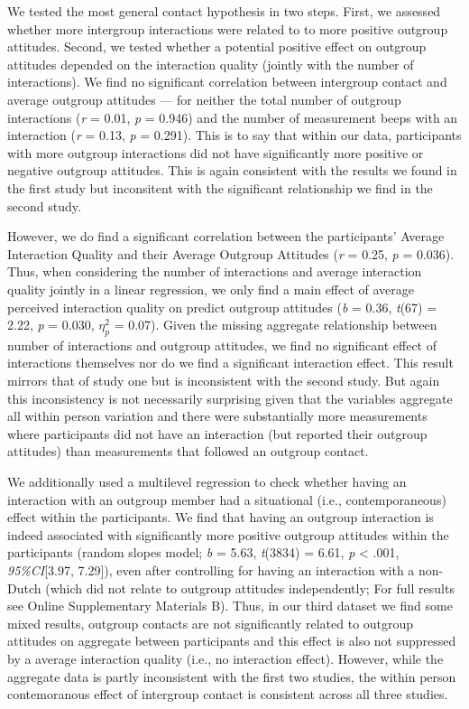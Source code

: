 We tested the most general contact hypothesis in two steps. First, we
assessed whether more intergroup interactions were related to to more
positive outgroup attitudes. Second, we tested whether a potential
positive effect on outgroup attitudes depended on the interaction
quality (jointly with the number of interactions). We find no
significant correlation between intergroup contact and average outgroup
attitudes --- for neither the total number of outgroup interactions
(\textit{r} = 0.01, \textit{p} = 0.946) and the number of measurement
beeps with an interaction (\textit{r} = 0.13, \textit{p} = 0.291). This
is to say that within our data, participants with more outgroup
interactions did not have significantly more positive or negative
outgroup attitudes. This is again consistent with the results we found
in the first study but inconsitent with the significant relationship we
find in the second study.

However, we do find a significant correlation between the participants'
Average Interaction Quality and their Average Outgroup Attitudes
(\textit{r} = 0.25, \textit{p} = 0.036). Thus, when considering the
number of interactions and average interaction quality jointly in a
linear regression, we only find a main effect of average perceived
interaction quality on predict outgroup attitudes (\textit{b} = 0.36,
\textit{t}(67) = 2.22, \textit{p} = 0.030, \(\eta_p^2\) = 0.07). Given
the missing aggregate relationship between number of interactions and
outgroup attitudes, we find no significant effect of interactions
themselves nor do we find a significant interaction effect. This result
mirrors that of study one but is inconsistent with the second study. But
again this inconsistency is not necessarily surprising given that the
variables aggregate all within person variation and there were
substantially more measurements where participants did not have an
interaction (but reported their outgroup attitudes) than measurements
that followed an outgroup contact.

We additionally used a multilevel regression to check whether having an
interaction with an outgroup member had a situational (i.e.,
contemporaneous) effect within the participants. We find that having an
outgroup interaction is indeed associated with significantly more
positive outgroup attitudes within the participants (random slopes
model; \textit{b} = 5.63, \textit{t}(3834) = 6.61, \textit{p}
\textless{} .001, \textit{95\%CI}{[}3.97, 7.29{]}), even after
controlling for having an interaction with a non-Dutch (which did not
relate to outgroup attitudes independently; For full results see Online
Supplementary Materials B). Thus, in our third dataset we find some
mixed results, outgroup contacts are not significantly related to
outgroup attitudes on aggregate between participants and this effect is
also not suppressed by a average interaction quality (i.e., no
interaction effect). However, while the aggregate data is partly
inconsistent with the first two studies, the within person contemoranous
effect of intergroup contact is consistent across all three studies.

